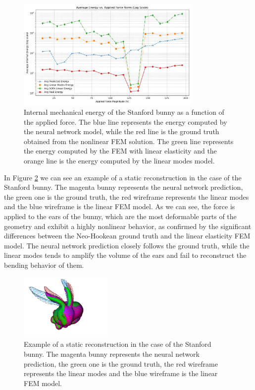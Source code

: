 \begin{figure}[H]
    \centering
    \includegraphics[width=0.8\textwidth]{Images/bunny_static_energy.png}
    \caption{Internal mechanical energy of the Stanford bunny as a function of the applied force. The blue line represents the energy computed by the neural network model, while the red line is the ground truth obtained from the nonlinear FEM solution. The green line represents the energy computed by the FEM with linear elasticity and the orange line is the energy computed by the linear modes model.}
    \label{fig:static_energy_bunny}
    \end{figure}
In  Figure \ref{fig:sofa_example_bunny} we can see an example of a static reconstruction in the case of the Stanford bunny. The magenta bunny represents the neural network prediction, the green one is the ground truth, the red wireframe represents the linear modes and the blue wireframe is the linear FEM model. As we can see, the force is applied  to the ears of the bunny, which are the most deformable parts of the geometry and exhibit a highly nonlinear behavior, as confirmed by the significant differences between the Neo-Hookean ground truth and the linear elasticity FEM model. The neural network prediction closely follows the ground truth, while the linear modes tends to amplify the volume of the ears and fail to reconstruct the bending behavior of them.

\begin{figure}[H]
    \centering
    \includegraphics[width=0.4\textwidth]{Images/sofa_example_bunny.png}
    \caption{Example of a static reconstruction in the case of the Stanford bunny. The magenta bunny represents the neural network prediction, the green one is the ground truth, the red wireframe represents the linear modes and the blue wireframe is the linear FEM model.}
    \label{fig:sofa_example_bunny}
    \end{figure}
    
